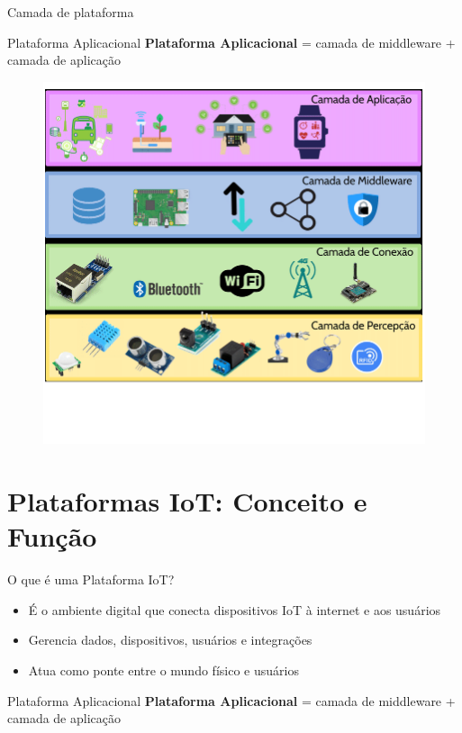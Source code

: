 \documentclass[aspectratio=169,xcolor=dvipsnames]{beamer}
\begin{document}
\begin{frame}{Camada de plataforma}
\begin{exampleblock}{Plataforma Aplicacional}
\textbf{Plataforma Aplicacional} = camada de middleware + camada de aplicação
\end{exampleblock}
\begin{figure}
    \centering
 \includegraphics[scale=.33]{Representacao-de-camadas-da-arquitetura-IoT-Adaptado-de-Andrade-et-al-2018}
\end{figure}
\end{frame}

\section{Plataformas IoT: Conceito e Função}

\begin{frame}{O que é uma Plataforma IoT?}
\begin{itemize}
    \item É o ambiente digital que conecta dispositivos IoT à internet e aos usuários
    \item Gerencia dados, dispositivos, usuários e integrações
    \item Atua como ponte entre o mundo físico e usuários
\end{itemize}
\begin{alertblock}{Plataforma Aplicacional}
\textbf{Plataforma Aplicacional} = camada de middleware + camada de aplicação
\end{alertblock}
\end{frame}
\end{document}
